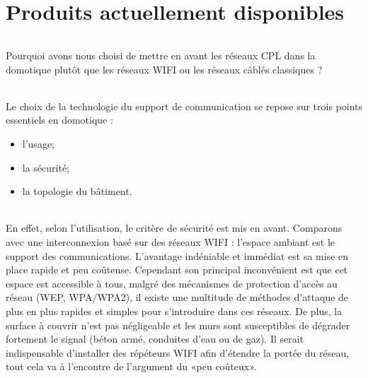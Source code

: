     \clearpage

\part{Produits actuellement disponibles}

    \paragraph{}
Pourquoi avons nous choisi de mettre en avant les réseaux CPL dans la domotique plutôt que les réseaux WIFI ou les réseaux câblés classiques ?
    \paragraph{}
Le choix de la technologie du support de communication se repose sur trois points essentiels en domotique :
        \begin{itemize}
            \item l'usage;
            \item la sécurité;
            \item la topologie du bâtiment.
        \end{itemize}

    \paragraph{}
En effet, selon l’utilisation, le critère de sécurité est mis en avant.
Comparons avec une interconnexion basé sur des réseaux WIFI : l’espace ambiant est le support des communications.
L’avantage indéniable et immédiat est sa mise en place rapide et peu coûteuse.
Cependant son principal inconvénient est que cet espace est accessible à tous,
malgré des mécanismes de protection d'accès au réseau (WEP, WPA/WPA2),
il existe une multitude de méthodes d’attaque de plus en plus rapides et simples pour s’introduire dans ces réseaux.
De plus, la surface à couvrir n'est pas négligeable et les murs sont susceptibles de dégrader fortement le signal (béton armé, conduites d'eau ou de gaz).
Il serait indispensable d’installer des répéteurs WIFI afin d’étendre la portée du réseau, tout cela va à l'encontre de l’argument du «peu coûteux».

